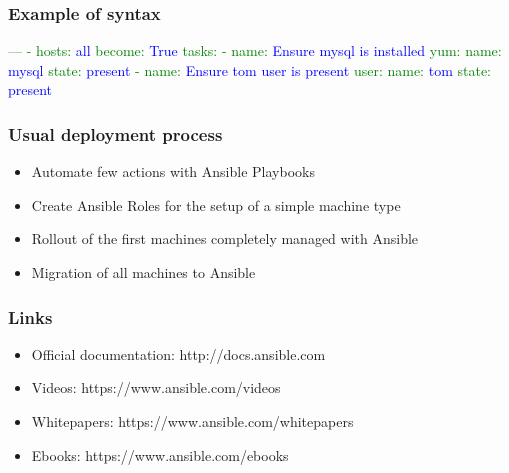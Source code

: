 \documentclass[t,aspectratio=169]{beamer}
\begin{document}
\begin{frame}[fragile]
    \frametitle{Example of syntax}
    \begin{semiverbatim}
\textcolor{green}{---}
\textcolor{green}{- hosts:} \textcolor{blue}{all}
\textcolor{green}{  become:} \textcolor{blue}{True}
\textcolor{green}{  tasks:}
\textcolor{green}{  - name:} \textcolor{blue}{Ensure mysql is installed}
\textcolor{green}{    yum:}
\textcolor{green}{      name:} \textcolor{blue}{mysql}
\textcolor{green}{      state:} \textcolor{blue}{present}
\textcolor{green}{  - name:} \textcolor{blue}{Ensure tom user is present}
\textcolor{green}{    user:}
\textcolor{green}{      name:} \textcolor{blue}{tom}
\textcolor{green}{      state:} \textcolor{blue}{present}
    \end{semiverbatim}
\end{frame}

\begin{frame}
    \frametitle{Usual deployment process}
    \begin{itemize}
        \item<2-> Automate few actions with Ansible Playbooks
        \item<3-> Create Ansible Roles for the setup of a simple machine type
        \item<4-> Rollout of the first machines completely managed with Ansible
        \item<5-> Migration of all machines to Ansible
    \end{itemize}
\end{frame}

\begin{frame}
    \frametitle{Links}
    \begin{itemize}
        \item Official documentation: http://docs.ansible.com
        \item Videos: https://www.ansible.com/videos
        \item Whitepapers: https://www.ansible.com/whitepapers
        \item Ebooks: https://www.ansible.com/ebooks
    \end{itemize}
\end{frame}

\end{document}

